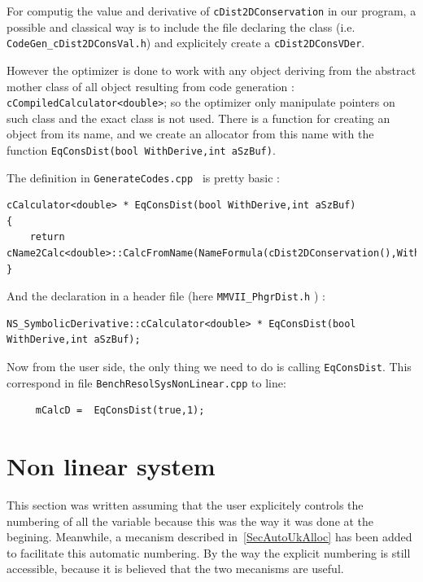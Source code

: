 \label{CreateCalc}

For computig the value and derivative of {\tt cDist2DConservation} in our \CPP program,
 a possible and classical way is to include the file declaring the class
(i.e. {\tt CodeGen\_cDist2DConsVal.h}) and explicitely create a {\tt cDist2DConsVDer}.

However the optimizer is done to work with any object deriving from the abstract mother
class of all object resulting from code generation :  {\tt cCompiledCalculator<double>};
so the optimizer only manipulate pointers on such class and the exact class is not used.
There is a function for creating an object from its name, and we create an allocator
from this name with the function {\tt  EqConsDist(bool WithDerive,int aSzBuf)}.

The definition in {\tt GenerateCodes.cpp }  is pretty basic :

\begin{lstlisting}
cCalculator<double> * EqConsDist(bool WithDerive,int aSzBuf)
{
    return cName2Calc<double>::CalcFromName(NameFormula(cDist2DConservation(),WithDerive),aSzBuf);
}
\end{lstlisting}


And the declaration in a header file (here {\tt MMVII\_PhgrDist.h} ) :


\begin{lstlisting}
NS_SymbolicDerivative::cCalculator<double> * EqConsDist(bool WithDerive,int aSzBuf);
\end{lstlisting}

Now from the user side, the only thing we need to do is calling  {\tt EqConsDist}. This
correspond in file {\tt BenchResolSysNonLinear.cpp}  to line:


\begin{lstlisting}
     mCalcD =  EqConsDist(true,1);
\end{lstlisting}



\section{Non linear system}

This section was written assuming that the user explicitely controls the numbering of all
the variable because this was the way it was done at the begining. Meanwhile, a mecanism
described in~\ref{SecAutoUkAlloc} has been added to facilitate this automatic numbering.
By the way the explicit numbering is still accessible, because it is believed that the
two mecanisms are useful.

